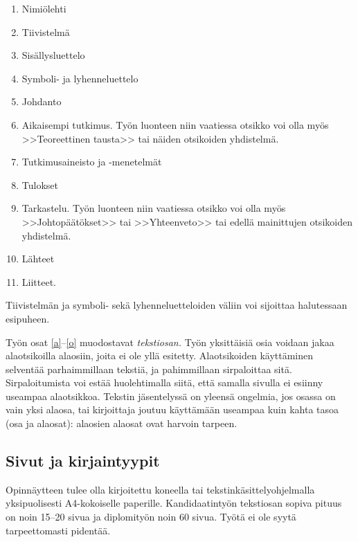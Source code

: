 \documentclass[finnish, 12pt, a4paper, elec, utf8, a-1b, online]{aaltothesis}
\begin{document}
\begin{enumerate}
\item Nimiölehti
\item Tiivistelmä
\item Sisällysluettelo
\item Symboli- ja lyhenneluettelo
\item \label{a} Johdanto
\item  Aikaisempi tutkimus. Työn luonteen niin vaatiessa otsikko voi olla myös
        >>Teoreettinen tausta>>  tai näiden otsikoiden yhdistelmä.
\item Tutkimusaineisto ja -menetelmät %
\item Tulokset
\item \label{o} Tarkastelu. Työn luonteen niin vaatiessa otsikko voi olla myös
		>>Johtopäätökset>> tai >>Yhteenveto>> tai edellä mainittujen otsikoiden
		yhdistelmä.
\item Lähteet
\item Liitteet.
\end{enumerate}

Tiivistelmän ja symboli- sekä lyhenneluetteloiden väliin voi sijoittaa
halutessaan esipuheen.

Työn osat \ref{a}--\ref{o} muodostavat \textit{tekstiosan.}  Työn yksittäisiä
osia voidaan jakaa alaotsikoilla alaosiin, joita ei ole yllä esitetty.
Alaotsikoiden käyttäminen selventää parhaimmillaan tekstiä, ja pahimmillaan
sirpaloittaa sitä.  Sirpaloitumista voi estää huolehtimalla siitä, että samalla
sivulla ei esiinny useampaa alaotsikkoa. Tekstin jäsentelyssä on yleensä
ongelmia, jos osassa on vain yksi alaosa, tai kirjoittaja joutuu käyttämään
useampaa kuin kahta tasoa (osa ja alaosat): alaosien alaosat ovat harvoin tarpeen.

\subsection*{Sivut ja kirjaintyypit}

Opinnäytteen tulee olla kirjoitettu koneella tai
tekstinkäsittelyohjelmalla yksipuolisesti A4-kokoiselle paperille.
Kandidaatintyön tekstiosan sopiva pituus on noin 15--20 sivua ja
diplomityön noin 60 sivua. Työtä ei ole syytä tarpeettomasti pidentää.
\end{document}
